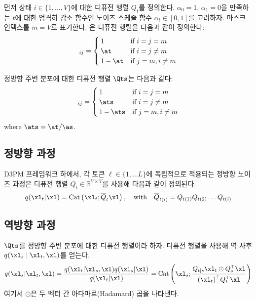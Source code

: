 \documentclass{article} %
\begin{document}
먼저 상태 $i \in \{1, \dots, V\}$에 대한 디퓨전 행렬 $Q_t$를 정의한다. $\alpha_{0} = 1$, $\alpha_{1} = 0$을 만족하는 $t$에 대한 엄격히 감소 함수인 노이즈 스케줄 함수 $\alpha_t \in [0, 1]$를 고려하자. 마스크 인덱스를 $m=V$로 표기한다. \citet{austin2021structured}은 디퓨전 행렬을 다음과 같이 정의한다:
\begin{align}
    [Q_t]_{ij} =
    \begin{cases}
    1 & \text{if } i = j = m \\
    \at & \text{if } i = j \neq m \\
    1-\at & \text{if } j = m, i \neq m
    \end{cases}
\end{align}

정방향 주변 분포에 대한 디퓨전 행렬 $\Qts$는 다음과 같다:
\begin{align}
    [Q_{t|s}]_{ij} =
    \begin{cases}
    1 & \text{if } i = j = m \\
    \ats & \text{if } i = j \neq m \\
    1-\ats & \text{if } j = m, i \neq m
    \end{cases}
\end{align}
\noindent where $\ats = \at / \as$.


\subsection{정방향 과정}

D3PM 프레임워크 \citep{austin2021structured} 하에서, 각 토큰 $\ell \in \{1, \dots L\}$에 독립적으로 적용되는 정방향 노이즈 과정은 디퓨전 행렬 $Q_t \in \mathbb{R}^{V \times V}$를 사용해 다음과 같이 정의된다.
\begin{align}
q(\xl_t | \xl) = \text{Cat} \left( \xl_t; \overline{Q}_t \xl \right), \quad \text{with} \quad \overline{Q}_{t(i)} = Q_{t(1)} Q_{t(2)} \dots Q_{t(i)}
\end{align}


\subsection{역방향 과정}

$\Qts$를 정방향 주변 분포에 대한 디퓨전 행렬이라 하자. 디퓨전 행렬을 사용해 역 사후 $q(\xl_s \mid \xl_t, \xl)$를 얻는다.
\begin{align}
q(\xl_{s} | \xl_t, \xl) = \frac{q(\xl_t | \xl_{s}, \xl) q(\xl_{s} | \xl)}{q(\xl_t | \xl)} = \text{Cat} \left( \xl_{s}; \frac{Q_{t|s} \xl_t \odot Q_s^\top \xl}{{(\xl_t)}^\top  Q_t^\top \xl} \right)
\end{align}
\noindent 여기서 $\odot$은 두 벡터 간 아다마르(Hadamard) 곱을 나타낸다.
\end{document}
